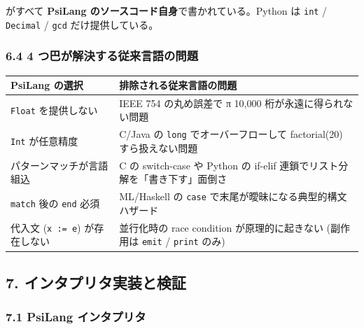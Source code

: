 \documentclass[
]{ltjsarticle}
\newcounter{none} %
\begin{document}
がすべて \textbf{PsiLang のソースコード自身}で書かれている。Python は
\texttt{int} / \texttt{Decimal} / \texttt{gcd} だけ提供している。

\subsubsection{6.4 4
つ巴が解決する従来言語の問題}\label{ux3064ux5df4ux304cux89e3ux6c7aux3059ux308bux5f93ux6765ux8a00ux8a9eux306eux554fux984c}

{\def\LTcaptype{none} %
\begin{longtable}[]{@{}
  >{\raggedright\arraybackslash}p{}
  >{\raggedright\arraybackslash}p{}@{}}
\toprule\noalign{}
\begin{minipage}[b]{\linewidth}\raggedright
PsiLang の選択
\end{minipage} & \begin{minipage}[b]{\linewidth}\raggedright
排除される従来言語の問題
\end{minipage} \\
\midrule\noalign{}
\endhead
\bottomrule\noalign{}
\endlastfoot
\texttt{Float} を提供しない & IEEE 754 の丸め誤差で π 10,000
桁が永遠に得られない問題 \\
\texttt{Int} が任意精度 & C/Java の \texttt{long} でオーバーフローして
factorial(20) すら扱えない問題 \\
パターンマッチが言語組込 & C の switch-case や Python の if-elif
連鎖でリスト分解を「書き下す」面倒さ \\
\texttt{match} 後の \texttt{end} 必須 & ML/Haskell の \texttt{case}
で末尾が曖昧になる典型的構文ハザード \\
代入文 (\texttt{x\ :=\ e}) が存在しない & 並行化時の race condition
が原理的に起きない (副作用は \texttt{emit} / \texttt{print} のみ) \\
\end{longtable}
}

\subsection{7.
インタプリタ実装と検証}\label{ux30a4ux30f3ux30bfux30d7ux30eaux30bfux5b9fux88c5ux3068ux691cux8a3c}

\subsubsection{7.1 PsiLang
インタプリタ}\label{psilang-ux30a4ux30f3ux30bfux30d7ux30eaux30bf}
\end{document}
